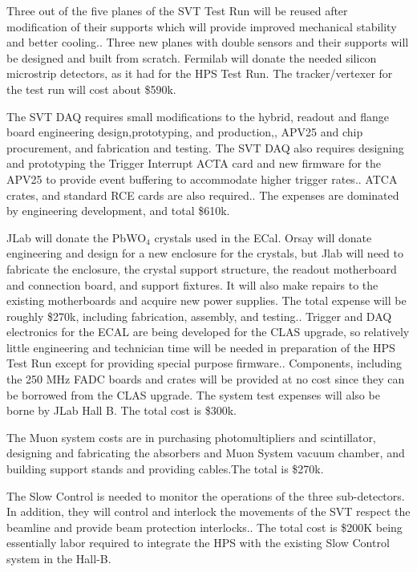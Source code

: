 Three out of the five planes of the SVT Test Run will be reused after modification of their supports which will provide improved mechanical stability and better cooling.. Three new planes with double sensors and their supports will be designed and built from scratch. Fermilab will donate the needed silicon microstrip detectors, as it had for the HPS Test Run. The tracker/vertexer for the test run will cost about \$590k.

The SVT DAQ requires small modifications to the  hybrid, readout  and flange board engineering design,prototyping, and production,, APV25 and chip procurement, and  fabrication and testing. The SVT DAQ also requires designing and prototyping the Trigger Interrupt ACTA card and new firmware for the APV25 to provide event buffering to accommodate higher trigger rates.. ATCA crates, and standard RCE cards are also required.. The expenses are dominated by engineering development, and total \$610k.  

JLab will donate the PbWO$_4$ crystals used in the ECal. Orsay will donate engineering and design for a new enclosure for the crystals, but Jlab will need to fabricate the enclosure, the crystal support structure, the readout motherboard and connection board, and support fixtures. It will also make repairs to the existing motherboards and acquire new power supplies. The total expense will be roughly \$270k, including fabrication, assembly, and testing.. Trigger and DAQ electronics for the ECAL are being developed for the CLAS upgrade, so relatively little engineering and technician time will be needed in preparation of the HPS Test Run except for providing special purpose firmware.. Components, including the 250 MHz FADC boards and crates will be provided at no cost since they can be borrowed from the CLAS upgrade. The system test expenses will also be borne by JLab Hall B. The total cost is \$300k. 

The Muon system costs are in purchasing  photomultipliers and scintillator, designing and fabricating  the absorbers and Muon System vacuum chamber, and building support stands and providing cables.The total is \$270k. 

The Slow Control is needed to monitor the operations of the three sub-detectors. In addition, they will control and interlock the movements of the SVT respect the beamline and provide beam protection interlocks.. The total cost is \$200K being essentially labor required to integrate the HPS with the existing Slow Control system in the Hall-B.

